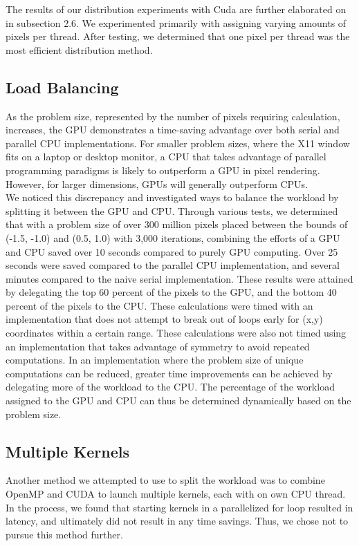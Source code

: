 \documentclass{article}
\begin{document}
The results of our distribution experiments with Cuda are further elaborated on in subsection 2.6. We experimented primarily with assigning varying amounts of pixels per thread. After testing, we determined that one pixel per thread was the most efficient distribution method. 

\subsection{Load Balancing}

As the problem size, represented by the number of pixels requiring calculation, increases, the GPU demonstrates a time-saving advantage over both serial and parallel CPU implementations.
For smaller problem sizes, where the X11 window fits on a laptop or desktop monitor, a CPU that takes advantage of parallel programming paradigms is likely to outperform a GPU in pixel rendering.
However, for larger dimensions, GPUs will generally outperform CPUs.\\

We noticed this discrepancy and investigated ways to balance the workload by splitting it between the GPU and CPU.
Through various tests, we determined that with a problem size of over 300 million pixels placed between the bounds of (-1.5, -1.0) and (0.5, 1.0) with 3,000 iterations, combining the efforts of a GPU and CPU saved over 10 seconds compared to purely GPU computing.
Over 25 seconds were saved compared to the parallel CPU implementation, and several minutes compared to the naive serial implementation.
These results were attained by delegating the top 60 percent of the pixels to the GPU, and the bottom 40 percent of the pixels to the CPU.
These calculations were timed with an implementation that does not attempt to break out of loops early for (x,y) coordinates within a certain range.
These calculations were also not timed using an implementation that takes advantage of symmetry to avoid repeated computations.
In an implementation where the problem size of unique computations can be reduced, greater time improvements can be achieved by delegating more of the workload to the CPU.
The percentage of the workload assigned to the GPU and CPU can thus be determined dynamically based on the problem size.

\subsection{Multiple Kernels}

Another method we attempted to use to split the workload was to combine OpenMP and CUDA to launch multiple kernels, each with on own CPU thread.
In the process, we found that starting kernels in a parallelized for loop resulted in latency, and ultimately did not result in any time savings.
Thus, we chose not to pursue this method further.
\end{document}
